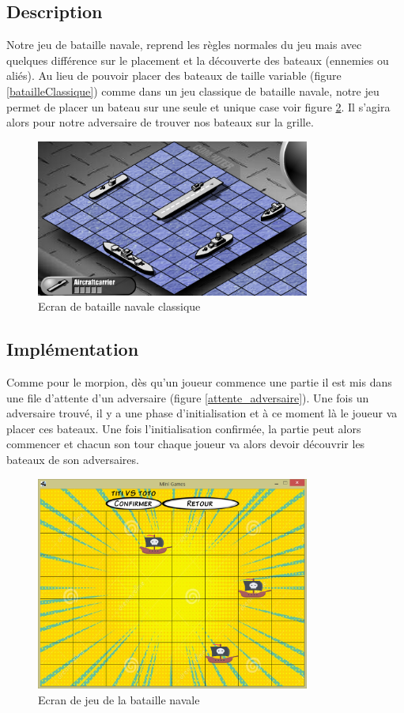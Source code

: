 \documentclass{report}
\begin{document}
\subsection{Description}
Notre jeu de bataille navale, reprend les règles normales du jeu mais avec quelques différence sur le placement et la découverte des bateaux (ennemies ou aliés). Au lieu de pouvoir placer
des bateaux de taille variable (figure \ref{batailleClassique}) comme dans un jeu classique de bataille navale, notre jeu permet de placer un bateau sur une seule et unique case
voir figure \ref{notreBataille}. Il s'agira alors pour notre adversaire de trouver nos bateaux sur la grille.

\begin{figure}[H]
	\centering\includegraphics[width=9cm]{batailleClassique}
	\caption{Ecran de bataille navale classique}
	\label{batailleClassiqe}
\end{figure}

\subsection{Implémentation}
Comme pour le morpion, dès qu'un joueur commence une partie il est mis dans une file d'attente d'un adversaire (figure \ref{attente_adversaire}).
Une fois un adversaire trouvé, il y a une phase d'initialisation et à ce moment là le joueur va placer ces bateaux. Une fois l'initialisation confirmée,
la partie peut alors commencer et chacun son tour chaque joueur va alors devoir découvrir les bateaux de son adversaires.

\begin{figure}[H]
	\centering\includegraphics[width=9cm]{notreBataille}
	\caption{Ecran de jeu de la bataille navale}
	\label{notreBataille}
\end{figure}
\end{document}
